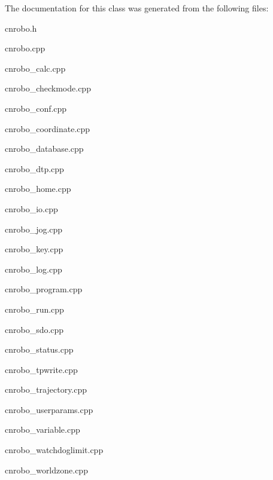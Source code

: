 The documentation for this class was generated from the following files\-:\begin{DoxyCompactItemize}
\item 
cnrobo.\-h\item 
cnrobo.\-cpp\item 
cnrobo\-\_\-calc.\-cpp\item 
cnrobo\-\_\-checkmode.\-cpp\item 
cnrobo\-\_\-conf.\-cpp\item 
cnrobo\-\_\-coordinate.\-cpp\item 
cnrobo\-\_\-database.\-cpp\item 
cnrobo\-\_\-dtp.\-cpp\item 
cnrobo\-\_\-home.\-cpp\item 
cnrobo\-\_\-io.\-cpp\item 
cnrobo\-\_\-jog.\-cpp\item 
cnrobo\-\_\-key.\-cpp\item 
cnrobo\-\_\-log.\-cpp\item 
cnrobo\-\_\-program.\-cpp\item 
cnrobo\-\_\-run.\-cpp\item 
cnrobo\-\_\-sdo.\-cpp\item 
cnrobo\-\_\-status.\-cpp\item 
cnrobo\-\_\-tpwrite.\-cpp\item 
cnrobo\-\_\-trajectory.\-cpp\item 
cnrobo\-\_\-userparams.\-cpp\item 
cnrobo\-\_\-variable.\-cpp\item 
cnrobo\-\_\-watchdoglimit.\-cpp\item 
cnrobo\-\_\-worldzone.\-cpp\end{DoxyCompactItemize}

